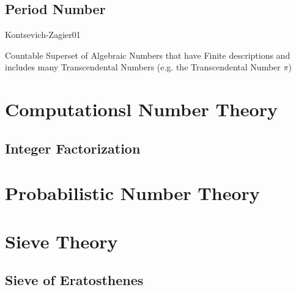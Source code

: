 \subsection{Period Number}\label{sec:period_number}

Kontsevich-Zagier01

Countable Superset of Algebraic Numbers that have Finite descriptions
and includes many Transcendental Numbers (e.g. the Transcendental
Number $\pi$)



\section{Computationsl Number Theory}\label{sec:computational_number_theory}

\subsection{Integer Factorization}\label{sec:integer_factorization}



\section{Probabilistic Number Theory}\label{sec:probabilistic_number_theory}

\section{Sieve Theory}\label{sec:sieve_theory}

\subsection{Sieve of Eratosthenes}\label{sec:sieve}



